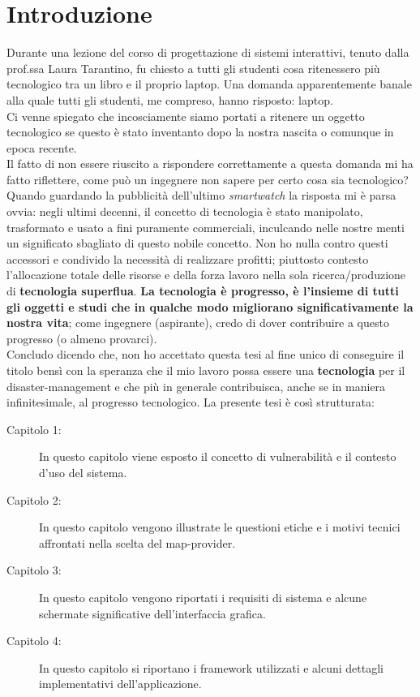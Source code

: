 \chapter*{Introduzione}
\thispagestyle{empty}

Durante una lezione del corso di progettazione di sistemi interattivi, tenuto dalla prof.ssa Laura Tarantino, fu chiesto a tutti gli studenti cosa ritenessero più tecnologico tra un libro e il proprio laptop. Una domanda apparentemente banale alla quale tutti gli studenti, me compreso, hanno risposto: laptop.\\
Ci venne spiegato che incosciamente siamo portati a ritenere un oggetto tecnologico se questo è stato inventanto dopo la nostra nascita o comunque in epoca recente.\\
Il fatto di non essere riuscito a rispondere correttamente a questa domanda mi ha fatto riflettere, come può un ingegnere non sapere per certo cosa sia tecnologico? Quando guardando la pubblicità dell'ultimo \textit{smartwatch} la risposta mi è parsa ovvia: negli ultimi decenni, il concetto di tecnologia è stato manipolato, trasformato e usato a fini puramente commerciali, inculcando nelle nostre menti un significato sbagliato di questo nobile concetto. Non ho nulla contro questi accessori e condivido la necessità di realizzare profitti; piuttosto contesto l'allocazione totale delle risorse e della forza lavoro nella sola ricerca/produzione di \textbf{tecnologia superflua}.
\textbf{La tecnologia è progresso, è l'insieme di tutti gli oggetti e studi che in qualche modo migliorano significativamente la nostra vita}; come ingegnere (aspirante), credo di dover contribuire a questo progresso (o almeno provarci).\\
Concludo dicendo che, non ho accettato questa tesi al fine unico di conseguire il titolo bensì con la speranza che il mio lavoro possa essere una \textbf{tecnologia} per il disaster-management e che più in generale contribuisca, anche se in maniera infinitesimale, al progresso tecnologico.
\newpage
La presente tesi è così strutturata:
\begin{description}
\item [Capitolo 1:] In questo capitolo viene esposto il concetto di vulnerabilità e il contesto d'uso del sistema. 
\item [Capitolo 2:] In questo capitolo vengono illustrate le questioni etiche e i motivi tecnici affrontati nella scelta del map-provider.
\item [Capitolo 3:] In questo capitolo vengono riportati i requisiti di sistema e alcune schermate significative dell'interfaccia grafica.
\item [Capitolo 4:] In questo capitolo si riportano i framework utilizzati e alcuni dettagli implementativi dell'applicazione.
\end{description}